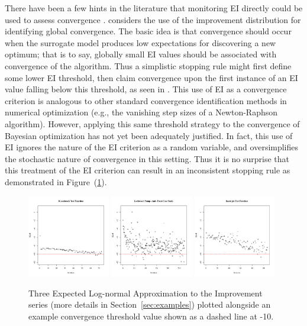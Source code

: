 \documentclass{article}
\begin{document}
%
There have been a few hints in the literature that monitoring EI
directly could be used to assess convergence \citep{jonesEIOpt}. 
\cite{taddyOpt} considers the use of the improvement distribution for 
identifying global convergence. The basic idea 
is that convergence should occur when the surrogate model produces 
low expectations for discovering a new optimum; that is to say, globally small 
EI values should be associated with convergence of the algorithm. Thus a 
simplistic stopping rule might first define some lower EI threshold, then claim 
convergence upon the first instance of an EI value falling below 
this threshold, as seen in \cite{windExample}. This use of EI as a convergence 
criterion is analogous to other standard convergence identification methods in 
numerical optimization (e.g., the vanishing step sizes of a Newton-Raphson 
algorithm). However, applying this same threshold strategy to the convergence 
of Bayesian optimization has not yet been adequately justified. In 
fact, this use of EI ignores the nature of the EI criterion as a random 
variable, and oversimplifies the stochastic nature of convergence in this 
setting. Thus it is no surprise that this treatment of the EI criterion 
can result in an inconsistent stopping rule as demonstrated in 
\mbox{Figure (\ref{introFig}).}

%
%
\begin{figure}[htb]
\includegraphics[width=0.32\textwidth]{./figures/introChartRoseEasyEasyAxis.pdf}
\includegraphics[width=0.32\textwidth]{./figures/introChartLock6Three20000Axis.pdf}
\includegraphics[width=0.32\textwidth]{./figures/introChartRastHardAxis.pdf}
\caption{
%
Three Expected Log-normal Approximation to the Improvement series (more details in Section~\ref{sec:examples}) plotted alongside an example convergence threshold value shown as a dashed line at -10.
}
\label{introFig}
\end{figure}
%
%
\end{document}
